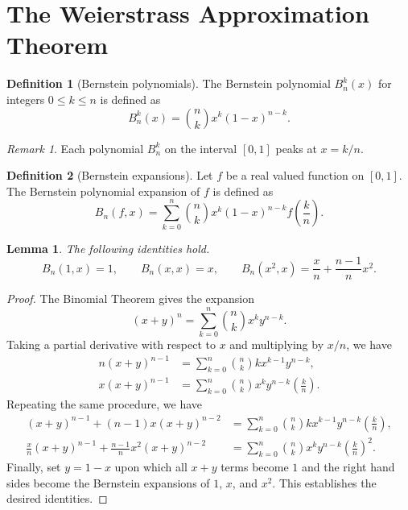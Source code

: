 \documentclass[11pt]{article}
\newtheorem{lemma}[theorem]{Lemma}
\theoremstyle{definition}
\newtheorem{definition}{Definition}[section]
\theoremstyle{remark}
\newtheorem*{remark}{Remark}
\begin{document}
    \section{The Weierstrass Approximation Theorem}
    \begin{definition}[Bernstein polynomials]
        The Bernstein polynomial $B_n^k(x)$ for integers $0 \leq k \leq n$ is defined
        as \[
            B_n^k(x) = \binom{n}{k} x^k (1 - x)^{n - k}.
        \] 
    \end{definition}
    \begin{remark}
        Each polynomial $B_n^k$ on the interval $[0, 1]$ peaks at $x = k / n$.
    \end{remark}

    \begin{definition}[Bernstein expansions]
        Let $f$ be a real valued function on $[0, 1]$. The Bernstein polynomial
        expansion of $f$ is defined as \[
            B_n(f, x) = \sum_{k = 0}^n \binom{n}{k} x^k(1 - x)^{n - k}f\left(
            \frac{k}{n} \right).
        \]
    \end{definition}
    \begin{lemma}
        The following identities hold. \[
            B_n(1, x) = 1, \qquad B_n(x, x) = x, \qquad B_n(x^2, x) = \frac{x}{n} +
            \frac{n - 1}{n}x^2.
        \] 
    \end{lemma}
    \begin{proof}
        The Binomial Theorem gives the expansion \[
            (x + y)^n = \sum_{k = 0}^n \binom{n}{k} x^k y^{n - k}.
        \] Taking a partial derivative with respect to $x$ and multiplying by $x/n$, we
        have
        \begin{align*}
            n(x + y)^{n - 1} &= \sum_{k = 0}^n \binom{n}{k} kx^{k - 1} y^{n - k}, \\
            x(x + y)^{n - 1} &= \sum_{k = 0}^n \binom{n}{k} x^k y^{n - k}
            \left( \frac{k}{n} \right).
        \end{align*}
        Repeating the same procedure, we have
        \begin{align*}
            (x + y)^{n - 1} + (n - 1)x(x + y)^{n - 2} &= \sum_{k = 0}^n \binom{n}{k}
            kx^{k - 1} y^{n - k} \left( \frac{k}{n} \right), \\
            \frac{x}{n}(x + y)^{n - 1} + \frac{n - 1}{n}x^2(x + y)^{n - 2} &= \sum_{k
            = 0}^n \binom{n}{k} x^k y^{n - k} \left( \frac{k}{n} \right)^2.
        \end{align*}
        Finally, set $y = 1 - x$ upon which all $x + y$ terms become $1$ and the
        right hand sides become the Bernstein expansions of $1$, $x$, and $x^2$. This
        establishes the desired identities.
    \end{proof}
    
\end{document}
